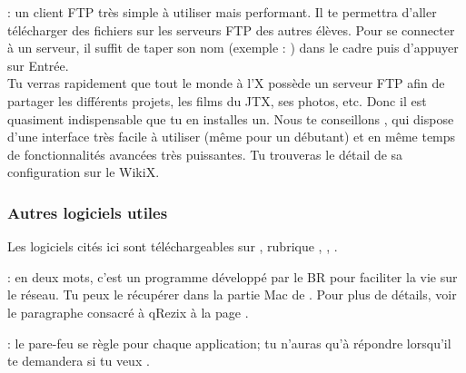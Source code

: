   : un client FTP très simple à utiliser mais performant. Il te permettra d'aller télécharger des fichiers sur les serveurs FTP des autres élèves.
Pour se connecter à un serveur, il suffit de taper son nom (exemple : ) dans le cadre  puis d'appuyer sur Entrée.\\
Tu verras rapidement que tout le monde à l'X possède un serveur FTP afin de partager les différents projets, les films du JTX, ses photos, etc. Donc il est quasiment indispensable que tu en installes un. Nous te conseillons , qui dispose d'une interface très facile à utiliser (même pour un débutant) et en même temps de fonctionnalités avancées très puissantes. Tu trouveras le détail de sa configuration sur le WikiX.

\subsubsection{Autres logiciels utiles}

Les logiciels cités ici sont téléchargeables sur , rubrique , , .

  : en deux mots, c'est un programme développé par le BR pour faciliter la vie sur le réseau. Tu peux le récupérer dans la partie Mac de \xshare. Pour plus de détails, voir le paragraphe consacré à qRezix à la page \pageref{qrezix}.

  : le pare-feu se règle pour chaque application; tu n'auras qu'à répondre  lorsqu'il te demandera si tu veux .




